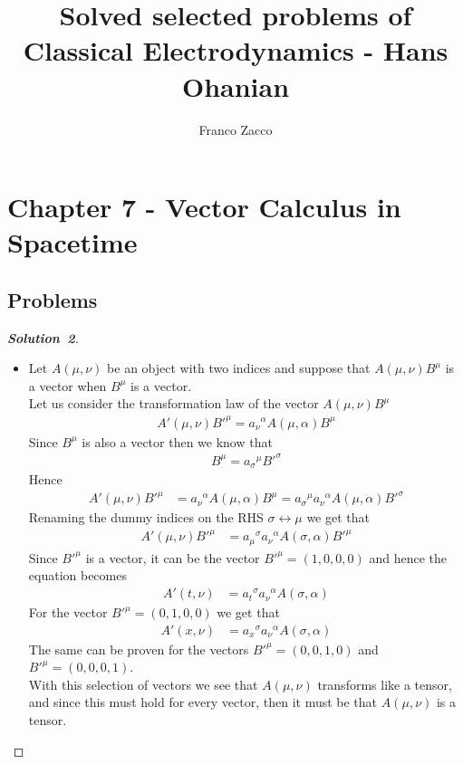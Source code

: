 \documentclass[11pt]{article}
\title{\textbf{Solved selected problems of Classical Electrodynamics - Hans Ohanian}}
\author{Franco Zacco}
\date{}
\theoremstyle{definition}
\renewcommand*{\proofname}{\bf{Solution}}
\begin{document}
\maketitle
\thispagestyle{empty}

\section*{Chapter 7 - Vector Calculus in Spacetime}

\subsection*{Problems}
\begin{proof}[\proofname\ 2]\leavevmode\par
\begin{itemize}
\item [(a)] Let $A(\mu,\nu)$ be an object with two indices and suppose that
$A(\mu, \nu)B^\mu$ is a vector when $B^\mu$ is a vector. \\
Let us consider the transformation law of the vector $A(\mu,\nu)B^\mu$
\begin{align*}
    A'(\mu,\nu)B'^\mu = {a_\nu}^\alpha A(\mu,\alpha)B^\mu
\end{align*}
Since $B^\mu$ is also a vector then we know that 
\begin{align*}
    B^\mu = {a_\sigma}^\mu B'^\sigma
\end{align*}
Hence
\begin{align*}
    A'(\mu,\nu)B'^\mu &= {a_\nu}^\alpha A(\mu,\alpha)B^\mu
    = {a_\sigma}^\mu {a_\nu}^\alpha A(\mu,\alpha) B'^\sigma
\end{align*}
Renaming the dummy indices on the RHS $\sigma \leftrightarrow \mu$ we get that
\begin{align*}
    A'(\mu,\nu)B'^\mu 
    &= {a_\mu}^\sigma {a_\nu}^\alpha A(\sigma,\alpha) B'^\mu
\end{align*}
Since $B'^\mu$ is a vector, it can be the vector $B'^\mu = (1, 0, 0, 0)$
and hence the equation becomes 
\begin{align*}
    A'(t,\nu)
    &= {a_t}^\sigma {a_\nu}^\alpha A(\sigma,\alpha)
\end{align*}
For the vector $B'^\mu = (0, 1, 0, 0)$ we get that
\begin{align*}
    A'(x,\nu)
    &= {a_x}^\sigma {a_\nu}^\alpha A(\sigma,\alpha)
\end{align*}
The same can be proven for the vectors $B'^\mu = (0,0,1,0)$ and 
$B'^\mu = (0,0,0,1)$.\\
With this selection of vectors we see that $A(\mu, \nu)$ transforms like a
tensor, and since this must hold for every vector, then it must be that
$A(\mu, \nu)$ is a tensor.


\end{itemize}
\end{proof}
\end{document}
